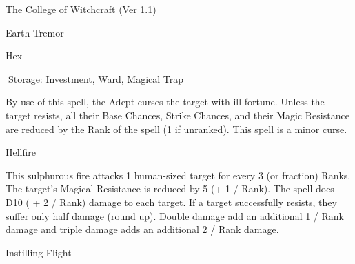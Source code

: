 \begin{Chapter}{The College of Witchcraft (Ver 1.1)}
\begin{spell}[S-11]{Earth Tremor }
\begin{effects}
\end{effects}
\end{spell}

\begin{spell}[S-12]{Hex }


Storage: Investment, Ward, Magical Trap 
\begin{effects}
 By  use  of  this  spell,  the  Adept  curses  the 
target with ill-fortune. Unless the target resists, all 
their  Base  Chances,  Strike  Chances,  and  their 
Magic  Resistance  are  reduced  by  the  Rank  of  the 
spell (1 if unranked). This spell is a minor curse. 

\end{effects}
\end{spell}

\begin{spell}[S-13]{Hellfire }

\begin{effects}
This sulphurous fire attacks 1 human-sized 
target for every 3 (or fraction) Ranks. The target’s 
Magical  Resistance  is  reduced  by  5  (+  1  /  Rank). 
The  spell  does  D10  (  +  2  /  Rank)  damage  to  each 
target.  If  a  target  successfully  resists,  they  suffer 
only  half  damage  (round  up).  Double  damage  add 
an  additional  1  /  Rank  damage  and  triple  damage 
adds an additional 2 / Rank damage. 

\end{effects}
\end{spell}

\begin{spell}[S-14]{Instilling Flight }


\end{spell}
\end{Chapter}
